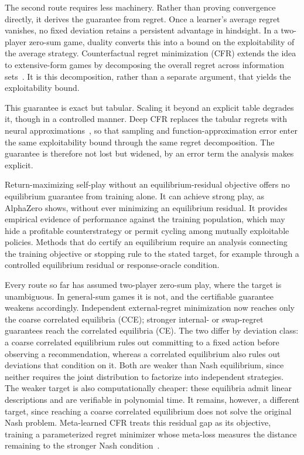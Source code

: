  The second route requires less machinery. Rather than proving convergence
directly, it derives the guarantee from regret. Once a learner's average regret
vanishes, no fixed deviation retains a persistent advantage in hindsight. In a
two-player zero-sum game, duality converts this into a bound on the exploitability
of the average strategy. Counterfactual regret minimization (CFR) extends the idea
to extensive-form games by decomposing the overall regret across information
sets~\citep{Zinkevich2007}. It is this decomposition, rather than a separate
argument, that yields the exploitability bound.

This guarantee is exact but tabular. Scaling it beyond an explicit table degrades
it, though in a controlled manner. Deep CFR replaces the tabular regrets with
neural approximations~\citep{BrownDeepCFR2019}, so that sampling and
function-approximation error enter the same exploitability bound through the same
regret decomposition. The guarantee is therefore not lost but widened, by an error
term the analysis makes explicit.

 Return-maximizing self-play without an
equilibrium-residual objective offers no equilibrium guarantee from training alone.
It can achieve strong play, as AlphaZero shows, without ever minimizing an
equilibrium residual. It provides empirical evidence of performance against the
training population, which may hide a profitable counterstrategy or permit
cycling among mutually exploitable policies. Methods that do certify an equilibrium
require an analysis connecting the training objective or stopping rule to the stated
target, for example through a controlled equilibrium residual or response-oracle
condition.

Every route so far has assumed two-player zero-sum play, where the target is
unambiguous. In general-sum games it is not, and the certifiable guarantee weakens
accordingly. Independent external-regret minimization now reaches only the coarse
correlated equilibria (CCE); stronger internal- or swap-regret guarantees reach
the correlated equilibria (CE). The two differ by deviation class: a coarse
correlated equilibrium rules out committing to a fixed action before observing a
recommendation, whereas a correlated equilibrium also rules out deviations that
condition on it. Both are weaker than Nash equilibrium, since neither requires the
joint distribution to factorize into independent strategies. The weaker target is
also computationally cheaper: these equilibria admit linear descriptions and are
verifiable in polynomial time. It remains, however, a different target, since
reaching a coarse correlated equilibrium does not solve the original Nash problem.
Meta-learned CFR treats this residual gap as its objective, training a
parameterized regret minimizer whose meta-loss measures the distance remaining to
the stronger Nash condition~\citep{Sychrovsky2025}.

